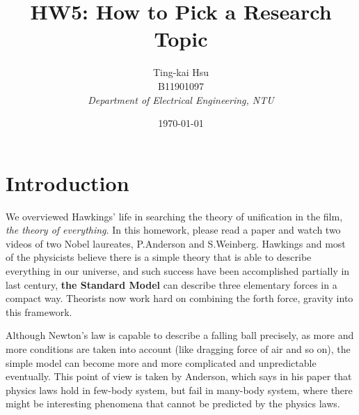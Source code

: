 \documentclass[12pt,a4paper]{article}
\title{HW5: How to Pick a Research Topic}
\author{
    Ting-kai Hsu\\
    B11901097\\
    \textit{Department of Electrical Engineering, NTU}
}
\date{\today}
\numberwithin{equation}{section}
\begin{document}
\maketitle

\tableofcontents
\section{Introduction}
We overviewed Hawkings' life in searching the theory of unification in the film, \textit{the theory of everything}. In this homework, please read a paper \cite{doi:10.1126/science.177.4047.393} and watch two videos of two Nobel laureates, P.Anderson and S.Weinberg. Hawkings and most of the physicists believe there is a simple theory that is able to describe everything in our universe, and such success have been accomplished partially in last century, \textbf{the Standard Model} can describe three elementary forces in a compact way. Theorists now work hard on combining the forth force, gravity into this framework.

Although Newton's law is capable to describe a falling ball precisely, as more and more conditions are taken into account (like dragging force of air and so on), the simple model can become more and more complicated and unpredictable eventually. This point of view is taken by Anderson, which says in his paper \cite{doi:10.1126/science.177.4047.393} that physics laws hold in few-body system, but fail in many-body system, where there might be interesting phenomena that cannot be predicted by the physics laws.


\end{document}
